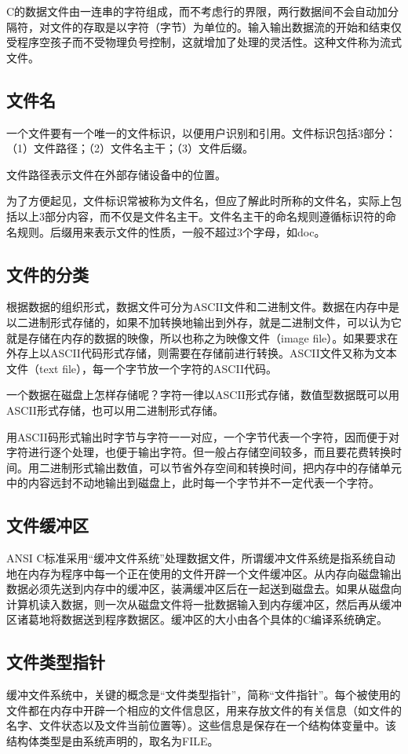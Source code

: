 C的数据文件由一连串的字符组成，而不考虑行的界限，两行数据间不会自动加分隔符，对文件的存取是以字符（字节）为单位的。输入输出数据流的开始和结束仅受程序空孩子而不受物理负号控制，这就增加了处理的灵活性。这种文件称为流式文件。
\subsection{文件名}
一个文件要有一个唯一的文件标识，以便用户识别和引用。文件标识包括3部分：（1）文件路径；（2）文件名主干；（3）文件后缀。

文件路径表示文件在外部存储设备中的位置。

为了方便起见，文件标识常被称为文件名，但应了解此时所称的文件名，实际上包括以上3部分内容，而不仅是文件名主干。文件名主干的命名规则遵循标识符的命名规则。后缀用来表示文件的性质，一般不超过3个字母，如doc。
\subsection{文件的分类}
根据数据的组织形式，数据文件可分为ASCII文件和二进制文件。数据在内存中是以二进制形式存储的，如果不加转换地输出到外存，就是二进制文件，可以认为它就是存储在内存的数据的映像，所以也称之为映像文件（image file）。如果要求在外存上以ASCII代码形式存储，则需要在存储前进行转换。ASCII文件又称为文本文件（text file），每一个字节放一个字符的ASCII代码。

一个数据在磁盘上怎样存储呢？字符一律以ASCII形式存储，数值型数据既可以用ASCII形式存储，也可以用二进制形式存储。

用ASCII码形式输出时字节与字符一一对应，一个字节代表一个字符，因而便于对字符进行逐个处理，也便于输出字符。但一般占存储空间较多，而且要花费转换时间。用二进制形式输出数值，可以节省外存空间和转换时间，把内存中的存储单元中的内容远封不动地输出到磁盘上，此时每一个字节并不一定代表一个字符。

\subsection{文件缓冲区}
ANSI C标准采用“缓冲文件系统”处理数据文件，所谓缓冲文件系统是指系统自动地在内存为程序中每一个正在使用的文件开辟一个文件缓冲区。从内存向磁盘输出数据必须先送到内存中的缓冲区，装满缓冲区后在一起送到磁盘去。如果从磁盘向计算机读入数据，则一次从磁盘文件将一批数据输入到内存缓冲区，然后再从缓冲区诸葛地将数据送到程序数据区。缓冲区的大小由各个具体的C编译系统确定。
\subsection{文件类型指针}
缓冲文件系统中，关键的概念是“文件类型指针”，简称“文件指针”。每个被使用的文件都在内存中开辟一个相应的文件信息区，用来存放文件的有关信息（如文件的名字、文件状态以及文件当前位置等）。这些信息是保存在一个结构体变量中。该结构体类型是由系统声明的，取名为FILE。

